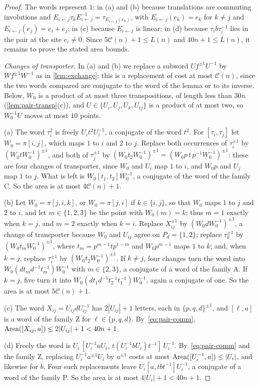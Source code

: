 \begin{proof}
The words represent $1$: in (a) and (b) because translations are commuting involutions and $E_{i\leftarrow j}\tau_kE_{i\leftarrow
j}^{-1}=\tau_{E_{i\leftarrow j}(e_k)}$, with $E_{i\leftarrow j}(e_k)=e_k$ for $k\ne j$ and $E_{i\leftarrow j}(e_j)=e_i+e_j$; in (c) because
$E_{i\leftarrow j}$ is linear; in (d) because $\tau_ib\tau_i^{-1}$ lies in the pair at the site $e_i\ne0$. Since $5\mathcal C(n)+1\le L(n)$
and $40n+1\le L(n)$, it remains to prove the stated area bounds.

\emph{Changes of transporter.} In (a) and (b) we replace a subword $Uf^{\pm1}U^{-1}$ by $Wf^{\pm1}W^{-1}$ as in \cref{lem:exchange}; this
is a replacement of cost at most $\mathcal C(n)$, since the two words compared are conjugate to the word of the lemma or to its inverse.
Below, $W_0$ is a product of at most three transpositions, of length less than $30n$ (\cref{lem:pair-transp}(c)), and
$U\in\{U_i,U_j,U_k,U_{ij}\}$ is a product of at most two, so $W_0^{-1}U$ moves at most $10$ points.

(a) The word $\tau_i^2$ is freely $U_it^2U_i^{-1}$, a conjugate of the word $t^2$. For $[\tau_i,\tau_j]$ let $W_0=\pi[i,j]$, which maps $1$ to
$i$ and $2$ to $j$. Replace both occurrences of $\tau_i^{\pm1}$ by $(W_0tW_0^{-1})^{\pm1}$, and both of $\tau_j^{\pm1}$ by
$(W_0t_2W_0^{-1})^{\pm1}=(W_0p\,t\,p^{-1}W_0^{-1})^{\pm1}$: these are four changes of transporter, since $W_0$ and $U_i$ map $1$ to $i$, and
$W_0p$ and $U_j$ map $1$ to $j$. What is left is $W_0[t_1,t_2]W_0^{-1}$, a conjugate of the word of the family \textsf{C}. So the area is at
most $4\mathcal C(n)+1$.

(b) Let $W_0=\pi[j,i,k]$, or $W_0=\pi[j,i]$ if $k\in\{i,j\}$, so that $W_0$ maps $1$ to $j$ and $2$ to $i$, and let $m\in\{1,2,3\}$ be the
point with $W_0(m)=k$; thus $m=1$ exactly when $k=j$, and $m=2$ exactly when $k=i$. Replace $X_{ij}^{\pm1}$ by $(W_0dW_0^{-1})^{\pm1}$, a
change of transporter because $W_0$ and $U_{ij}$ agree on $P_d=\{1,2\}$; replace $\tau_k^{\pm1}$ by $(W_0t_mW_0^{-1})^{\pm1}$, where
$t_m=p^{m-1}tp^{1-m}$ and $W_0p^{m-1}$ maps $1$ to $k$; and, when $k=j$, replace $\tau_i^{\pm1}$ by $(W_0t_2W_0^{-1})^{\pm1}$. If $k\ne j$,
four changes turn the word into $W_0(dt_md^{-1}t_m^{-1})W_0^{-1}$ with $m\in\{2,3\}$, a conjugate of a word of the family \textsf{A}. If
$k=j$, five turn it into $W_0(dt_1d^{-1}t_2^{-1}t_1^{-1})W_0^{-1}$, again a conjugate of one. So the area is at most $5\mathcal C(n)+1$.

(c) The word $X_{ij}=U_{ij}dU_{ij}^{-1}$ has $2|U_{ij}|+1$ letters, each in $\{p,q,d\}^{\pm1}$, and $[\ell,a]$ is a word of the family
\textsf{Z} for $\ell\in\{p,q,d\}$. By~\eqref{eq:pair-comm}, $\operatorname{Area}([X_{ij},a])\le2|U_{ij}|+1<40n+1$.

(d) Freely the word is $U_i\,[U_i^{-1}aU_i,\ t(U_i^{-1}bU_i)t^{-1}]\,U_i^{-1}$. By~\eqref{eq:pair-comm} and the family \textsf{Z}, replacing
$U_i^{-1}a^{\pm1}U_i$ by $a^{\pm1}$ costs at most $\operatorname{Area}([U_i^{-1},a])\le|U_i|$, and likewise for $b$. Four such replacements leave
$U_i[a,tbt^{-1}]U_i^{-1}$, a conjugate of a word of the family \textsf{P}. So the area is at most $4|U_i|+1<40n+1$.
\end{proof}

